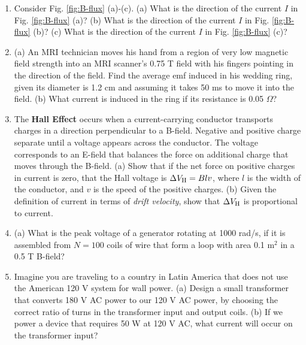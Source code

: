 \documentclass[12pt,twocolumn]{article}
\begin{document}
\noindent
\begin{enumerate}
\item Consider Fig. \ref{fig:B-flux} (a)-(c).  (a) What is the direction of the current $I$ in Fig. \ref{fig:B-flux} (a)?  (b) What is the direction of the current $I$ in Fig. \ref{fig:B-flux} (b)?  (c) What is the direction of the current $I$ in Fig. \ref{fig:B-flux} (c)? \\ \vspace{2cm}
\item (a) An MRI technician moves his hand from a region of very low magnetic field strength into an MRI scanner's 0.75 T field with his fingers pointing in the direction of the field. Find the average emf induced in his wedding ring, given its diameter is 1.2 cm and assuming it takes 50 ms to move it into the field. (b) What current is induced in the ring if its resistance is 0.05 $\Omega$? \\ \vspace{2cm}
\item The \textbf{Hall Effect} occurs when a current-carrying conductor transports charges in a direction perpendicular to a B-field.  Negative and positive charge separate until a voltage appears across the conductor.  The voltage corresponds to an E-field that balances the force on additional charge that moves through the B-field.  (a) Show that if the net force on positive charges in current is zero, that the Hall voltage is $\Delta V_{\rm H} = B l v$, where $l$ is the width of the conductor, and $v$ is the speed of the positive charges.  (b) Given the definition of current in terms of \textit{drift velocity}, show that $\Delta V_{\rm H}$ is proportional to current.  \\ \vspace{3cm}
\item (a) What is the peak voltage of a generator rotating at 1000 rad/s, if it is assembled from $N = 100$ coils of wire that form a loop with area 0.1 m$^2$ in a 0.5 T B-field? \\ \vspace{2cm}
\item Imagine you are traveling to a country in Latin America that does not use the American 120 V system for wall power.  (a) Design a small transformer that converts 180 V AC power to our 120 V AC power, by choosing the correct ratio of turns in the transformer input and output coils. (b) If we power a device that requires 50 W at 120 V AC, what current will occur on the transformer input? \\ \vspace{2cm}

\end{enumerate}
\end{document}
